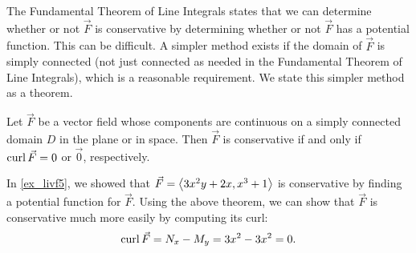 The Fundamental Theorem of Line Integrals states that we can determine whether or not $\vec F$ is conservative by determining whether or not $\vec F$ has a potential function. This can be difficult. A simpler method exists if the domain of $\vec F$ is simply connected (not just connected as needed in the Fundamental Theorem of Line Integrals), which is a reasonable requirement. We state this simpler method as a theorem.

\begin{theorem}\label{thm:conservative_field_curl}%
Let $\vec F$ be a vector field whose components are continuous on a simply connected domain $D$ in the plane or in space. Then $\vec F$ is conservative if and only if $\operatorname{curl} \vec F = 0$ or $\vec 0$, respectively.
\end{theorem}

In \autoref{ex_livf5}, we showed that $\vec F =\left\langle  3x^2y+2x,x^3+1\right\rangle$ is conservative by finding a potential function for $\vec F$. Using the above theorem, we can show that $\vec F$ is conservative much more easily by computing its curl:
\[\operatorname{curl} \vec F = N_x - M_y = 3x^2 - 3x^2 = 0.\]

